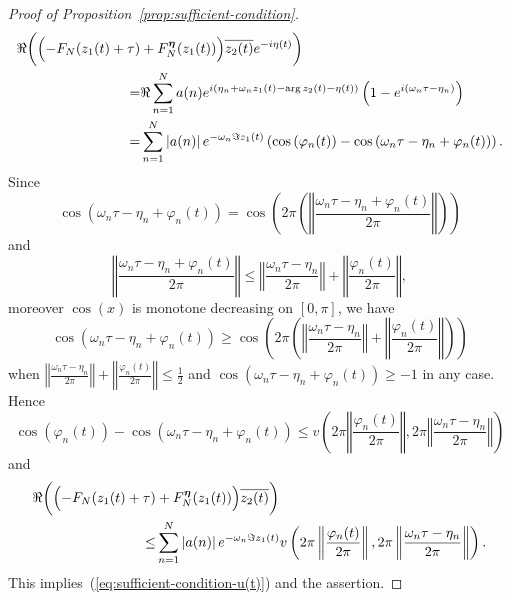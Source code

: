 \documentclass[10pt,a4paper]{amsart}
\begin{document}
\begin{proof}[Proof of Proposition~\ref{prop:sufficient-condition}]
\begin{align*}
\Re\biggl(\Bigl(-F_{N}(z_{1}(t)+\tau) & +F_{N}^{\boldsymbol{\eta}}(z_{1}(t))\Bigr)\overline{z_{2}(t)}e^{-i\eta(t)}\biggr)\\
= & \Re\sum_{n=1}^{N}a(n)e^{i\left(\eta_{n}+\omega_{n}z_{1}(t)-\arg z_{2}(t)-\eta(t)\right)}\left(1-e^{i\left(\omega_{n}\tau-\eta_{n}\right)}\right)\\
= & \sum_{n=1}^{N}\left|a(n)\right|e^{-\omega_{n}\Im z_{1}(t)}\left(\cos\left(\varphi_{n}(t)\right)-\cos\left(\omega_{n}\tau-\eta_{n}+\varphi_{n}(t)\right)\right).
\end{align*}
Since 
\[
\cos\left(\omega_{n}\tau-\eta_{n}+\varphi_{n}(t)\right)=\cos\left(2\pi\left(\left\Vert \frac{\omega_{n}\tau-\eta_{n}+\varphi_{n}(t)}{2\pi}\right\Vert \right)\right)
\]
and
\[
\left\Vert \frac{\omega_{n}\tau-\eta_{n}+\varphi_{n}(t)}{2\pi}\right\Vert \leq\left\Vert \frac{\omega_{n}\tau-\eta_{n}}{2\pi}\right\Vert +\left\Vert \frac{\varphi_{n}(t)}{2\pi}\right\Vert ,
\]
moreover $\cos(x)$ is monotone decreasing on $[0,\pi]$, we have
\[
\cos\left(\omega_{n}\tau-\eta_{n}+\varphi_{n}(t)\right)\geq\cos\left(2\pi\left(\left\Vert \frac{\omega_{n}\tau-\eta_{n}}{2\pi}\right\Vert +\left\Vert \frac{\varphi_{n}(t)}{2\pi}\right\Vert \right)\right)
\]
when $\left\Vert \frac{\omega_{n}\tau-\eta_{n}}{2\pi}\right\Vert +\left\Vert \frac{\varphi_{n}(t)}{2\pi}\right\Vert \leq\frac{1}{2}$
and $\cos\left(\omega_{n}\tau-\eta_{n}+\varphi_{n}(t)\right)\geq-1$
in any case. Hence
\[
\cos\left(\varphi_{n}(t)\right)-\cos\left(\omega_{n}\tau-\eta_{n}+\varphi_{n}(t)\right)\leq v\left(2\pi\left\Vert \frac{\varphi_{n}(t)}{2\pi}\right\Vert ,2\pi\left\Vert \frac{\omega_{n}\tau-\eta_{n}}{2\pi}\right\Vert \right)
\]
and
\begin{align*}
\Re\biggl(\Bigl(-F_{N}(z_{1}(t)+\tau) & +F_{N}^{\boldsymbol{\eta}}(z_{1}(t))\Bigr)\overline{z_{2}(t)}\biggr)\\
\leq & \sum_{n=1}^{N}\left|a(n)\right|e^{-\omega_{n}\Im z_{1}(t)}v\left(2\pi\left\Vert \frac{\varphi_{n}(t)}{2\pi}\right\Vert ,2\pi\left\Vert \frac{\omega_{n}\tau-\eta_{n}}{2\pi}\right\Vert \right).
\end{align*}
This implies~(\ref{eq:sufficient-condition-u(t)}) and the assertion. 
\end{proof}
\end{document}
